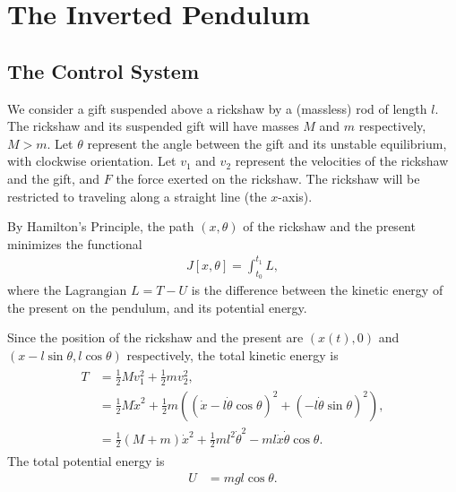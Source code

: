 \section*{The Inverted Pendulum}
\subsection*{The Control System}
We consider a gift suspended above a rickshaw by a (massless) rod of length $l$. 
The rickshaw and its suspended gift will have masses $M$ and $m$ respectively, $M > m$.  
Let $\theta $ represent the angle between the gift and its unstable equilibrium, with clockwise orientation. 
Let $v_1$ and $v_2$ represent the velocities of the rickshaw and the gift, and $F$ the force exerted on the rickshaw. 
The rickshaw will be restricted to traveling along a straight line (the $x$-axis). 

By Hamilton's Principle, the path $(x,\theta)$ of the rickshaw and the present minimizes the functional 
\begin{align}
J[x,\theta] = \int_{t_0}^{t_1}	L,
\end{align}
where the Lagrangian $L = T - U$ is the difference between the kinetic energy of the present on the pendulum, and its potential energy.

Since the position of the rickshaw and the present are $(x(t),0)$ and $(x-l\sin \theta, l\cos \theta)$ respectively, the total kinetic energy is 
\begin{align}
	\begin{split}
	T &= \frac{1}{2}Mv_1^2 +  \frac{1}{2}mv_2^2,\\
	&= \frac{1}{2}M\dot{x}^2 +  \frac{1}{2}m((\dot{x} - l\dot{\theta}\cos \theta)^2 + (- l\dot{\theta}\sin \theta)^2),\\
	&= \frac{1}{2}(M+m)\dot{x}^2 +\frac{1}{2}m l^2\dot{\theta}^2-ml\dot{x}\dot{\theta}\cos \theta.
	\end{split}
\end{align}
The total potential energy is 
\begin{align*}
U &= mgl\cos \theta.
\end{align*}


